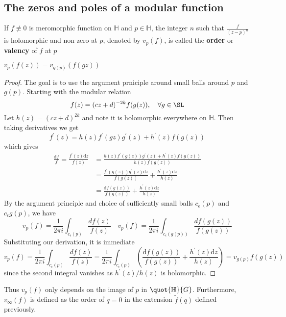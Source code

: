 \documentclass[12pt]{article}
\theoremstyle{definition}
\begin{document}
\subsection{The zeros and poles of a modular function}
\begin{dfn}
If \(f \not\equiv 0\) is meromorphic function on \(\mathbb{H}\)  and \(p \in \mathbb{H}\), the integer \(n\) such that \(\frac{f}{(z-p)^n}\) is holomorphic and non-zero at \(p\), denoted by \(v_p(f)\), is called the \textbf{order} or \textbf{valency} of \(f\) at \(p\)
\end{dfn}
\begin{claim}
    \(v_p(f(z))=v_{g(p)}(f(gz))\) 
\end{claim}
\begin{proof}
The goal is to use the argument prniciple around small balls around \(p\) and \(g(p)\). Starting with the modular relation
\[
    f(z) = (cz+d)^{-2k} f(g(z)), \quad \forall g \in \SL
\]
Let \(h(z) = (cz+d)^{2k}\) and note it is holomorphic everywhere on \(\mathbb{H} \). Then taking derivatives we get
\[
    f^{\prime} (z) = h(z) f^{\prime} (gz) g^{\prime} (z) + h^{\prime} (z) f(g(z))
\] 
which gives
\begin{align*}
    \frac{\mathrm{d} f}{f} = \frac{f^{\prime} (z)\mathrm{d} z}{f(z)}&= \frac{h(z)f^{\prime} (g(z)) g^{\prime} (z)+ h^{\prime} (z) f(g(z))}{h(z)f(g(z))}\\
    &= \frac{f^{\prime} (g(z)) g^{\prime} (z) \mathrm{d} z}{f(g(z))} + \frac{h^{\prime} (z)\mathrm{d} z}{h(z)}\\
    &= \frac{\mathrm{d}f(g(z)) }{f(g(z))} + \frac{h^{\prime} (z)\mathrm{d} z}{h(z)}
\end{align*}
By the argument principle and choice of sufficiently small balls \(c_{\epsilon }(p) \) and \(c_{\epsilon }g(p)\), we have
\[
    v_p(f) = \frac{1}{2\pi  i} \int_{c_{\epsilon }(p)} \frac{df(z)}{f(z)}\quad v_p(f) = \frac{1}{2\pi  i} \int_{c_{\epsilon }(g(p))} \frac{df(g(z))}{f(g(z))}
\]
Substituting our derivation, it is immediate
\[
    v_p(f) = \frac{1}{2\pi i} \int_{c_{\epsilon }(p)} \frac{df(z)}{f(z)}= \frac{1}{2\pi i} \int_{c_{\epsilon }(p)} \left(\frac{\mathrm{d}f(g(z)) }{f(g(z))} + \frac{h^{\prime} (z)\mathrm{d} z}{h(z)}\right) = v_{g(p)}f(g(z)) 
\]
since the second integral vanishes as \(h^{\prime} (z)/h(z)\) is holomorphic. 
\end{proof}
Thus \(v_p(f)\) only depends on the image of \(p\) in \(\quot{\mathbb{H} }{G} \). Furthermore, \(v_\infty (f)\) is defined as the order of \(q=0\) in the extension \(\widetilde{f}(q) \) defined previously.      
\end{document}
